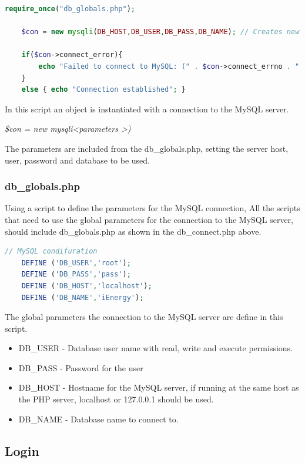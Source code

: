 \begin{lstlisting}[language=php]
	require_once("db_globals.php");
	
	$con = new mysqli(DB_HOST,DB_USER,DB_PASS,DB_NAME); // Creates new mysql connection
	
	if($con->connect_error){
		echo "Failed to connect to MySQL: (" . $con->connect_errno . " ) ". $con->connect_error;
	} 
	else { echo "Connection established"; }
\end{lstlisting}

In this script an object is instantiated with a connection to the MySQL server.

\textit{\$con = new mysqli\textless parameters \textgreater)}

The parameters are included from the db\_globals.php, setting the server host, user, password and database to be used.

\subsubsection{db\_globals.php}

Using a script to define the parameters for the MySQL connection, 
All the scripts that need to use the global parameters for the connection to the MySQL server, should include db\_globals.php as shown in the db\_connect.php above.

\begin{lstlisting}[language=php]
	// MySQL condifuration
	DEFINE ('DB_USER','root');
	DEFINE ('DB_PASS','pass');
	DEFINE ('DB_HOST','localhost');
	DEFINE ('DB_NAME','iEnergy');
\end{lstlisting}

The global parameters the connection to the MySQL server are define in this script.

\begin{itemize}
	\item DB\_USER - Database user name with read, write and execute permissions.
	\item DB\_PASS - Password for the user
	\item DB\_HOST - Hostname for the MySQL server, if running at the same host as the PHP server, localhost or 127.0.0.1 should be used.
	\item DB\_NAME - Database name to connect to.
\end{itemize}

\subsection{Login}

